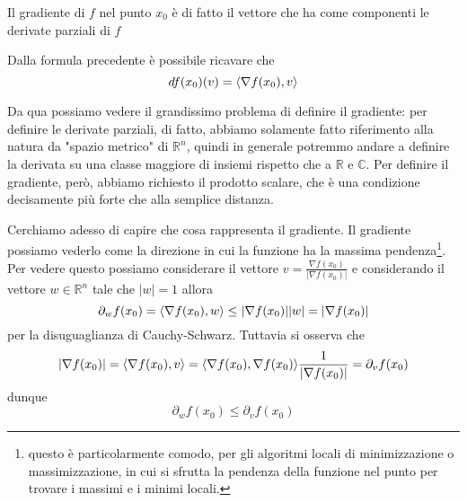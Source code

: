 \documentclass[openany]{book}
\begin{document}
\begin{remark}
Il gradiente di $f$ nel punto $x_0$ è di fatto il vettore che ha come componenti le derivate parziali di $f$
\end{remark}
\noindent Dalla formula precedente è possibile ricavare che
$$
df(x_0)(v) = \langle \nabla{f(x_0)}, v \rangle
$$
\begin{remark}
Da qua possiamo vedere il grandissimo problema di definire il gradiente: per definire le derivate parziali, di fatto, abbiamo solamente fatto riferimento alla natura da "spazio metrico" di $\mathbb{R}^n$, quindi in generale potremmo andare a definire la derivata su una classe maggiore di insiemi rispetto che a $\mathbb{R}$ e $\mathbb{C}$. Per definire il gradiente, però, abbiamo richiesto il prodotto scalare, che è una condizione decisamente più forte che alla semplice distanza.
\end{remark}
\noindent Cerchiamo adesso di capire che cosa rappresenta il gradiente. Il gradiente possiamo vederlo come la direzione in cui la funzione ha la massima pendenza\footnote{questo è particolarmente comodo, per gli algoritmi locali di minimizzazione o massimizzazione, in cui si sfrutta la pendenza della funzione nel punto per trovare i massimi e i minimi locali.}. Per vedere questo possiamo considerare il vettore $v = \frac{\nabla f(x_0)}{|\nabla f(x_0)|}$ e considerando il vettore $w \in \mathbb{R}^n$ tale che $|w| = 1$ allora
$$
\partial_w f(x_0) = \langle \nabla{f(x_0)}, w \rangle \leq |\nabla{f(x_0)}||w| = |\nabla{f(x_0)}|
$$
per la disuguaglianza di Cauchy-Schwarz. Tuttavia si osserva che
$$
|\nabla{f(x_0)}| = \langle \nabla{f(x_0)}, v \rangle = \langle \nabla{f(x_0)}, \nabla{f(x_0)} \rangle \frac{1}{|\nabla{f(x_0)}|} = \partial_v f(x_0)
$$
dunque
$$
\partial_w f(x_0) \leq \partial_v f(x_0)
$$
\end{document}
